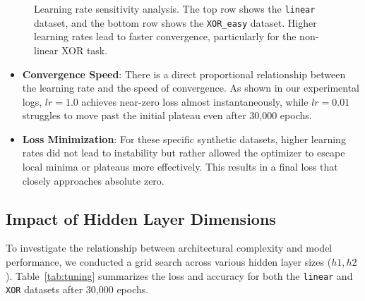 \documentclass[10pt,twocolumn,letterpaper]{article}
\begin{document}
\begin{figure}[t]
    \caption{Learning rate sensitivity analysis. The top row shows the \texttt{linear} dataset, and the bottom row shows the \texttt{XOR\_easy} dataset. Higher learning rates lead to faster convergence, particularly for the non-linear XOR task.}
    \label{fig:lr_tuning_grid}
\end{figure}

\begin{itemize}
    \item \textbf{Convergence Speed}: There is a direct proportional relationship between the learning rate and the speed of convergence. As shown in our experimental logs, $lr=1.0$ achieves near-zero loss almost instantaneously, while $lr=0.01$ struggles to move past the initial plateau even after 30,000 epochs.
    \item \textbf{Loss Minimization}: For these specific synthetic datasets, higher learning rates did not lead to instability but rather allowed the optimizer to escape local minima or plateaus more effectively. This results in a final loss that closely approaches absolute zero.
\end{itemize}

\subsection{Impact of Hidden Layer Dimensions}
To investigate the relationship between architectural complexity and model performance, we conducted a grid search across various hidden layer sizes ($h1, h2$). Table~\ref{tab:tuning} summarizes the loss and accuracy for both the \texttt{linear} and \texttt{XOR} datasets after 30,000 epochs.
\end{document}
